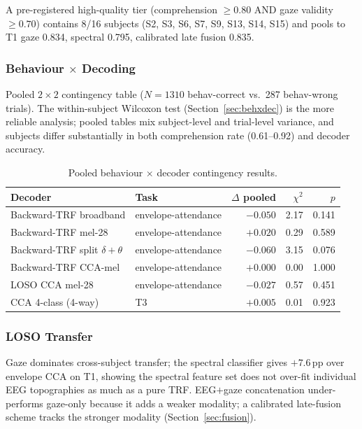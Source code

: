 \documentclass{article}
\begin{document}
A pre-registered high-quality tier (comprehension $\ge 0.80$ AND gaze
validity $\ge 0.70$) contains 8/16 subjects (S2, S3, S6, S7, S9, S13, S14,
S15) and pools to T1 gaze 0.834, spectral 0.795, calibrated late fusion
0.835.

\subsubsection{Behaviour $\times$ Decoding}
\label{app:beh}

Pooled $2{\times}2$ contingency table ($N{=}1310$ behav-correct
vs.\ 287 behav-wrong trials). The within-subject Wilcoxon test
(Section~\ref{sec:behxdec}) is the more reliable analysis; pooled tables mix
subject-level and trial-level variance, and subjects differ substantially in
both comprehension rate (0.61--0.92) and decoder accuracy.

\begin{table}[ht]
\centering
\small
\caption{Pooled behaviour $\times$ decoder contingency results.}
\label{tab:beh}
\begin{tabular}{llrrr}
\toprule
Decoder & Task & $\Delta$ pooled & $\chi^2$ & $p$ \\
\midrule
Backward-TRF broadband             & envelope-attendance & $-0.050$ & 2.17 & 0.141 \\
Backward-TRF mel-28                & envelope-attendance & $+0.020$ & 0.29 & 0.589 \\
Backward-TRF split $\delta+\theta$ & envelope-attendance & $-0.060$ & 3.15 & 0.076 \\
Backward-TRF CCA-mel               & envelope-attendance & $+0.000$ & 0.00 & 1.000 \\
LOSO CCA mel-28                    & envelope-attendance & $-0.027$ & 0.57 & 0.451 \\
CCA 4-class (4-way)                & T3                  & $+0.005$ & 0.01 & 0.923 \\
\bottomrule
\end{tabular}
\end{table}

\subsubsection{LOSO Transfer}
\label{app:loso}

Gaze dominates cross-subject transfer; the spectral classifier gives
$+7.6$\,pp over envelope CCA on T1, showing the spectral feature set does
not over-fit individual EEG topographies as much as a pure TRF. EEG$+$gaze
concatenation under-performs gaze-only because it adds a weaker modality; a
calibrated late-fusion scheme tracks the stronger modality
(Section~\ref{sec:fusion}).
\end{document}
